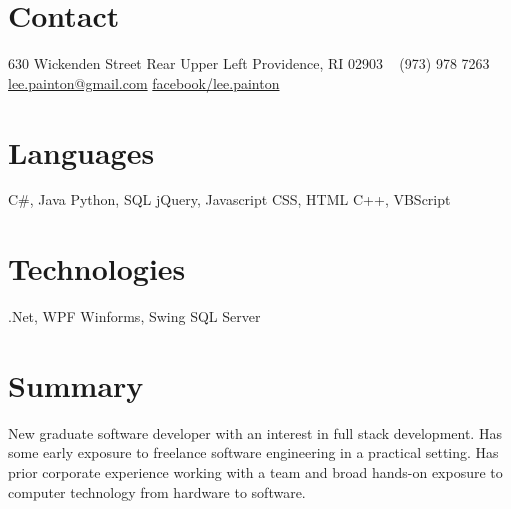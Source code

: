 \documentclass[]{friggeri-cv} %
\begin{document}


\begin{aside} %
\section{\color{brown}Con\color{black}tact}
630 Wickenden Street
Rear Upper Left
Providence, RI 02903
~
(973) 978 7263
~
\href{mailto:lee.painton@gmail.com}{lee.painton@gmail.com}
\href{https://www.facebook.com/lee.painton}{facebook/lee.painton}
\section{\color{violet}Lang\color{black}uages}
{\LARGE C\#, Java}
{\large Python, SQL}
{jQuery, Javascript}
{\small CSS, HTML}
{\footnotesize C++, VBScript}
\section{\color{olive}Tech\color{black}nologies}
{\LARGE .Net, WPF}
{\large Winforms, Swing}
{SQL Server}
\end{aside}


\section{Summary}

New graduate software developer with an interest in full stack development.  Has some early exposure to freelance software engineering in a practical setting.  Has prior corporate experience working with a team and broad hands-on exposure to computer technology from hardware to software.

\end{document}
